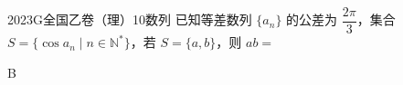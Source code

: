 
\begin{problem}{2023}{G}{全国乙卷（理）}{10}{数列}
已知等差数列 $ \{a_n\} $ 的公差为 $ \dfrac{2\pi}{3} $，集合 $ S = \{\cos a_n \mid n \in \mathbb{N}^*\} $，若 $ S = \{a, b\} $，则 $ ab = $
\begin{choices}
\end{choices}
\end{problem}

\begin{answer}
B
\end{answer}

\begin{solutions}

\end{solutions}